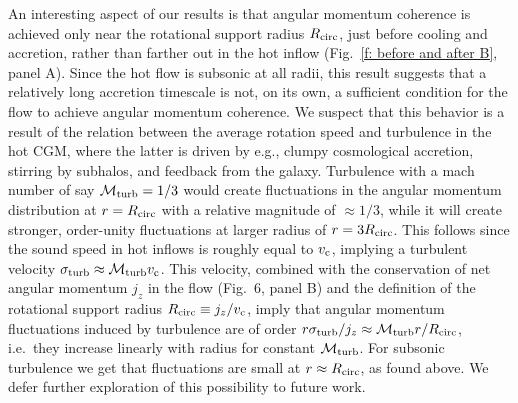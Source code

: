 \documentclass[fleqn,usenatbib]{mnras}
\begin{document}
\newcommand{\Rcirc}[]{R_{\rm circ}}
\newcommand{\vc}[]{v_{\rm c}}
\newcommand{\mturb}[]{\mathcal{M}_{\rm turb}}
An interesting aspect of our results is that angular momentum coherence is achieved only near the rotational support radius $\Rcirc$, just before cooling and accretion, rather than farther out in the hot inflow (Fig.~\ref{f: before and after B}, panel A). Since the hot flow is subsonic at all radii, this result suggests that a relatively long accretion timescale is not, on its own, a sufficient condition for the flow to achieve angular momentum coherence. We suspect that this behavior is a result of the relation between the average rotation speed and turbulence in the hot CGM, where the latter is driven by e.g., clumpy cosmological accretion, stirring by subhalos, and feedback from the galaxy. Turbulence with a mach number of say $\mturb=1/3$ would create fluctuations in the angular momentum distribution at $r=\Rcirc$ with a relative magnitude of $\approx 1/3$, while it will create stronger, order-unity fluctuations at larger radius of $r=3\Rcirc$. This follows since the sound speed in hot inflows is roughly equal to $\vc$,  implying a turbulent velocity $\sigma_{\rm turb}\approx \mturb\vc$. This velocity, combined with the conservation of net angular momentum $j_z$ in the flow (Fig.~6, panel B) and the definition of the rotational support radius $\Rcirc\equiv j_z/\vc$, imply that angular momentum fluctuations induced by turbulence are of order $r \sigma_{\rm turb}/j_z \approx \mturb r/ \Rcirc$, i.e.~they increase linearly with radius for constant $\mturb$. For subsonic turbulence we get that fluctuations are small at $r\approx\Rcirc$, as found above. We defer further exploration of this possibility to future work. 
\end{document}
